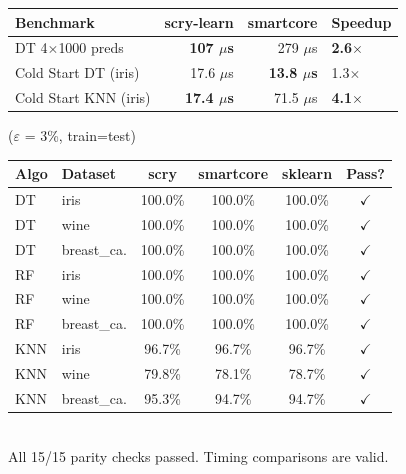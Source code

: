 \documentclass[11pt,a4paper]{article}
\newcommand{\hdr}[1]{\cellcolor{headerblue}\textbf{\color{darktext}#1}}
\newcommand{\win}[1]{\textbf{\color{wingreen}#1}}
\newcommand{\us}{$\mu$s}
\newcommand{\speedup}[1]{{\footnotesize\color{wingreen}\textbf{#1$\times$}}}
\newcommand{\slower}[1]{{\footnotesize\color{losered}#1$\times$}}
\begin{document}

\vspace{4pt}
\begin{table}[H]
\centering
\small
\setlength{\tabcolsep}{8pt}
\renewcommand{\arraystretch}{1.2}
\begin{tabular}{lrrl}
\toprule
\rowcolor{headerblue}
\hdr{Benchmark} & \hdr{scry-learn} & \hdr{smartcore} & \hdr{Speedup} \\
\midrule
DT 4$\times$1000 preds    & \win{107 \us}    & 279 \us              & \speedup{2.6} \\
\rowcolor{lightgray}
Cold Start DT (iris)       & 17.6 \us         & \win{13.8 \us}       & \slower{1.3} \\
Cold Start KNN (iris)      & \win{17.4 \us}   & 71.5 \us             & \speedup{4.1} \\
\bottomrule
\end{tabular}
\end{table}

 {\small\color{neutralgray}($\varepsilon$ = 3\%, train=test)}

\vspace{4pt}
\begin{table}[H]
\centering
\small
\setlength{\tabcolsep}{6pt}
\renewcommand{\arraystretch}{1.2}
\begin{tabular}{llcccc}
\toprule
\rowcolor{headerblue}
\hdr{Algo} & \hdr{Dataset} & \hdr{scry} & \hdr{smartcore} & \hdr{sklearn} & \hdr{Pass?} \\
\midrule
DT  & iris           & 100.0\% & 100.0\% & 100.0\% & \win{$\checkmark$} \\
\rowcolor{lightgray}
DT  & wine           & 100.0\% & 100.0\% & 100.0\% & \win{$\checkmark$} \\
DT  & breast\_ca.    & 100.0\% & 100.0\% & 100.0\% & \win{$\checkmark$} \\
\rowcolor{lightgray}
RF  & iris           & 100.0\% & 100.0\% & 100.0\% & \win{$\checkmark$} \\
RF  & wine           & 100.0\% & 100.0\% & 100.0\% & \win{$\checkmark$} \\
\rowcolor{lightgray}
RF  & breast\_ca.    & 100.0\% & 100.0\% & 100.0\% & \win{$\checkmark$} \\
KNN & iris           & 96.7\%  & 96.7\%  & 96.7\%  & \win{$\checkmark$} \\
\rowcolor{lightgray}
KNN & wine           & 79.8\%  & 78.1\%  & 78.7\%  & \win{$\checkmark$} \\
KNN & breast\_ca.    & 95.3\%  & 94.7\%  & 94.7\%  & \win{$\checkmark$} \\
\bottomrule
\end{tabular}
\\[2pt]
{\footnotesize\color{neutralgray} All 15/15 parity checks passed. Timing comparisons are valid.}
\end{table}
\end{document}
